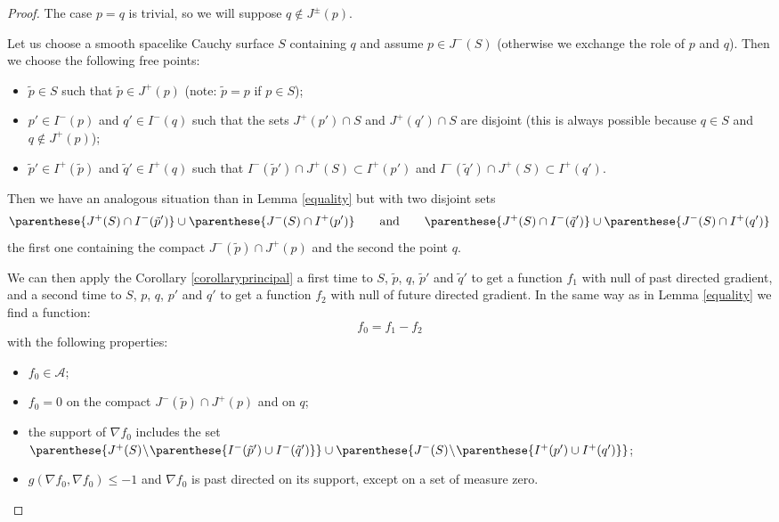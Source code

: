 \begin{proof}
The case $p=q$ is trivial, so we will suppose $q\notin J^{\pm}(p)$.

Let us choose a smooth spacelike Cauchy surface $S$ containing $q$ and assume $p \in J^-(S)$ (otherwise we exchange the role of $p$ and $q$). Then we choose the following free points:
\begin{itemize}\itemsep=0pt
\item $\tilde p \in S$ such that $\tilde p \in J^+(p)$ (note: $\tilde p = p$ if $p\in S$);
\item $p' \in I^-(p)$ and $q' \in I^-(q)$ such that the sets $J^+(p') \cap S$ and $J^+(q') \cap S$ are disjoint (this is always possible because $q\in S$ and $q\notin J^{+}(p)$);
\item $\tilde p' \in I^+(\tilde p)$ and $\tilde q' \in I^+(q)$ such that $I^-(\tilde p') \cap J^+(S) \subset I^+(p')$ and $I^-(\tilde q') \cap J^+(S) \subset I^+(q')$.
\end{itemize}
Then we have an analogous situation than in Lemma \ref{equality} but with two disjoint sets
\[
\parenthese{J^+(S) \cap I^-(\tilde p')} \cup  \parenthese{J^-(S) \cap I^+(p')}\qquad\text{and}\qquad\parenthese{J^+(S) \cap I^-(\tilde q')} \cup  \parenthese{J^-(S) \cap I^+(q')}
\]
the f\/irst one containing the compact $J^-(\tilde p) \cap J^+(p)$ and the second the point $q$.

We can then apply the Corollary \ref{corollaryprincipal} a f\/irst time to $S$, $\tilde p$, $q$, $\tilde p'$ and $\tilde q'$ to get a function $f_1$ with null of past directed gradient, and a second time to $S$, $p$, $q$, $p'$ and $q'$ to get a function $f_2$ with null of future directed gradient. In the same way as in Lemma \ref{equality} we f\/ind a function:
\[
f_0 = f_1 - f_2
\]
with the following properties:
\begin{itemize}\itemsep=0pt
\item $f_0\in\mathcal A$;
\item $f_0 = 0$ on the compact $J^-(\tilde p) \cap J^+(p)$ and on $q$;
\item the support of $\nabla f_0$ includes the set $\parenthese{J^+(S) \!\setminus \! \parenthese{I^-(\tilde p') \cup I^-(\tilde q')}} \cup    \parenthese{J^-(S)\! \setminus \!\parenthese{I^+(p') \cup I^+(q') }}$;
\item $g( \nabla f_0, \nabla f_0) \leq -1$ and $\nabla f_0$ is past directed on its support, except on a set of measure zero.
\end{itemize}


\end{proof}

